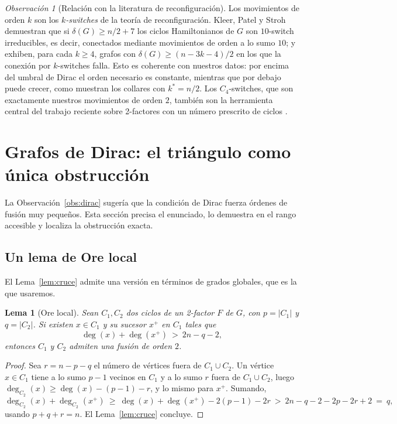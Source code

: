 \documentclass[11pt,a4paper]{article}
\newtheorem{lema}[teorema]{Lema}
\theoremstyle{definition}
\theoremstyle{remark}
\newtheorem{observacion}[teorema]{Observación}
\begin{document}
\begin{observacion}[Relación con la literatura de reconfiguración]
Los movimientos de orden $k$ son los \emph{$k$-switches} de la teoría de reconfiguración. Kleer, Patel y Stroh \cite{kps} demuestran que si $\delta(G)\ge n/2+7$ los ciclos Hamiltonianos de $G$ son $10$-switch irreducibles, es decir, conectados mediante movimientos de orden a lo sumo $10$; y exhiben, para cada $k\ge4$, grafos con $\delta(G)\ge(n-3k-4)/2$ en los que la conexión por $k$-switches falla. Esto es coherente con nuestros datos: por encima del umbral de Dirac el orden necesario es constante, mientras que por debajo puede crecer, como muestran los collares con $k^*=n/2$. Los $C_4$-switches, que son exactamente nuestros movimientos de orden $2$, también son la herramienta central del trabajo reciente sobre 2-factores con un número prescrito de ciclos \cite{twofactors}.
\end{observacion}


\section{Grafos de Dirac: el triángulo como única obstrucción}\label{sec:dirac}

La Observación~\ref{obs:dirac} sugería que la condición de Dirac fuerza órdenes de fusión muy pequeños. Esta sección precisa el enunciado, lo demuestra en el rango accesible y localiza la obstrucción exacta.

\subsection{Un lema de Ore local}

El Lema~\ref{lem:cruce} admite una versión en términos de grados globales, que es la que usaremos.

\begin{lema}[Ore local]\label{lem:orelocal}
Sean $C_1,C_2$ dos ciclos de un 2-factor $F$ de $G$, con $p=|C_1|$ y $q=|C_2|$. Si existen $x\in C_1$ y su sucesor $x^+$ en $C_1$ tales que
\[
\deg(x)+\deg(x^+)\ >\ 2n-q-2 ,
\]
entonces $C_1$ y $C_2$ admiten una fusión de orden $2$.
\end{lema}

\begin{proof}
Sea $r=n-p-q$ el número de vértices fuera de $C_1\cup C_2$. Un vértice $x\in C_1$ tiene a lo sumo $p-1$ vecinos en $C_1$ y a lo sumo $r$ fuera de $C_1\cup C_2$, luego
$\deg_{C_2}(x)\ge\deg(x)-(p-1)-r$, y lo mismo para $x^+$. Sumando,
\[
\deg_{C_2}(x)+\deg_{C_2}(x^+)\ \ge\ \deg(x)+\deg(x^+)-2(p-1)-2r\ >\ 2n-q-2-2p-2r+2\ =\ q,
\]
usando $p+q+r=n$. El Lema~\ref{lem:cruce} concluye.
\end{proof}
\end{document}
